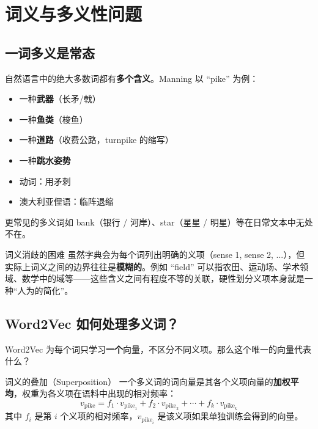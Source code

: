 \documentclass[a4paper]{article}
\begin{document}

\section{词义与多义性问题}

\subsection{一词多义是常态}

自然语言中的绝大多数词都有\textbf{多个含义}。Manning 以 ``pike'' 为例：





\begin{itemize}
    \item 一种\textbf{武器}（长矛/戟）
    \item 一种\textbf{鱼类}（梭鱼）
    \item 一种\textbf{道路}（收费公路，turnpike 的缩写）
    \item 一种\textbf{跳水姿势}
    \item 动词：用矛刺
    \item 澳大利亚俚语：临阵退缩
\end{itemize}

更常见的多义词如 bank（银行 / 河岸）、star（星星 / 明星）等在日常文本中无处不在。

\begin{warningbox}{词义消歧的困难}
虽然字典会为每个词列出明确的义项（sense 1, sense 2, ...），但实际上词义之间的边界往往是\textbf{模糊的}。例如 ``field'' 可以指农田、运动场、学术领域、数学中的域等——这些含义之间有程度不等的关联，硬性划分义项本身就是一种``人为的简化''。
\end{warningbox}

\subsection{Word2Vec 如何处理多义词？}

Word2Vec 为每个词只学习\textbf{一个}向量，不区分不同义项。那么这个唯一的向量代表什么？

\begin{importantbox}{词义的叠加（Superposition）}
一个多义词的词向量是其各个义项向量的\textbf{加权平均}，权重为各义项在语料中出现的相对频率：
$$v_{\text{pike}} = f_1 \cdot v_{\text{pike}_1} + f_2 \cdot v_{\text{pike}_2} + \cdots + f_k \cdot v_{\text{pike}_k}$$
其中 $f_i$ 是第 $i$ 个义项的相对频率，$v_{\text{pike}_i}$ 是该义项如果单独训练会得到的向量。
\end{importantbox}
\end{document}
